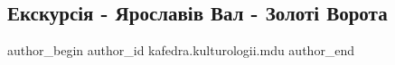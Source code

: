  
 
 
 
 

\subsection{Екскурсія - Ярославів Вал - Золоті Ворота}
\label{sec:05_05_2023.fb.kafedra.kulturologii.mdu.1.ekskursia_jaroslaviv_val_zoloti_vorota}

\ifcmt
 author_begin
   author_id kafedra.kulturologii.mdu
 author_end
\fi
